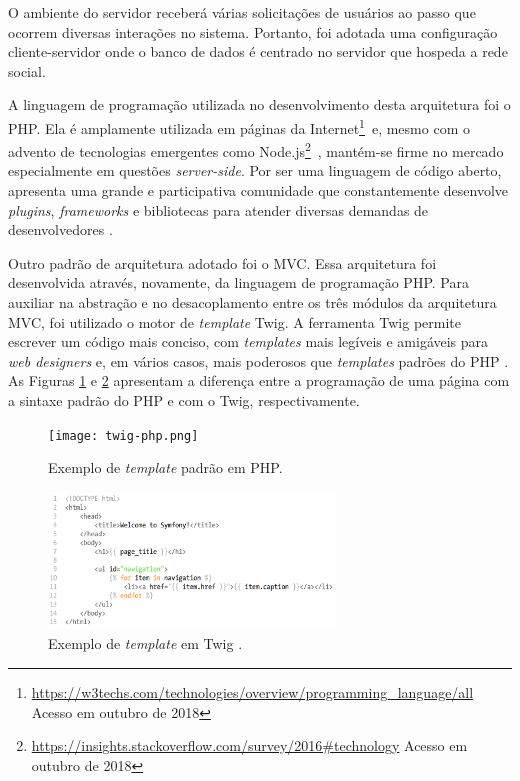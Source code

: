 O ambiente do servidor receberá várias solicitações de usuários ao passo que ocorrem diversas interações no sistema. Portanto, foi adotada uma configuração cliente-servidor onde o banco de dados é centrado no servidor que hospeda a rede social.

A linguagem de programação utilizada no desenvolvimento desta arquitetura foi o PHP. Ela é amplamente utilizada em páginas da Internet\footnote{\url{https://w3techs.com/technologies/overview/programming_language/all} Acesso em outubro de 2018}~e, mesmo com o advento de tecnologias emergentes como Node.js\footnote{\url{https://insights.stackoverflow.com/survey/2016\#technology} Acesso em outubro de 2018}~, mantém-se firme no mercado especialmente em questões \textit{server-side}. Por ser uma linguagem de código aberto, apresenta uma grande e participativa comunidade que constantemente desenvolve \textit{plugins}, \textit{frameworks} e bibliotecas para atender diversas demandas de desenvolvedores \cite{phpPatternsArticle2016}. 

Outro padrão de arquitetura adotado foi o MVC. Essa arquitetura foi desenvolvida através, novamente, da linguagem de programação PHP. Para auxiliar na abstração e no desacoplamento entre os três módulos da arquitetura MVC, foi utilizado o motor de \textit{template} Twig. A ferramenta Twig  permite escrever um código mais conciso, com \textit{templates} mais legíveis e amigáveis para \textit{web designers} e, em vários casos, mais poderosos que \textit{templates} padrões do PHP \cite{symfonyBook}. As Figuras \ref{codeTemplatePHP} e \ref{codeTemplateTwig} apresentam a diferença entre a programação de uma página com a sintaxe padrão do PHP e com o Twig, respectivamente.

\begin{figure}[ht]
    \caption{Exemplo de \textit{template} padrão em PHP.}
       	\begin{center}
            \texttt{[image: twig-php.png]}
        \end{center}
    \label{codeTemplatePHP}
\end{figure}

\bigskip

\begin{figure}[ht]
    \caption{Exemplo de \textit{template} em Twig .}
       	\begin{center}
            \includegraphics[width=0.68\textwidth]{figuras/twig-symf.png}
        \end{center}
    \label{codeTemplateTwig}
\end{figure}


